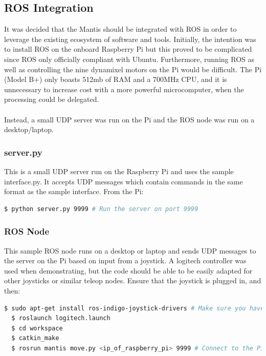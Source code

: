\documentclass[]{article}
\begin{document}
\subsection{ROS Integration}
It was decided that the Mantis should be integrated with ROS in order to leverage the existing ecosystem of software and tools. Initially, the intention was to install ROS on the onboard Raspberry Pi but this proved to be complicated since ROS only officially compliant with Ubuntu. Furthermore, running ROS as well as controlling the nine dynamixel motors on the Pi would be difficult. The Pi (Model B+) only boasts 512mb of RAM and a 700MHz CPU, and it is unnecessary to increase cost with a more powerful microcomputer, when the processing could be delegated.
\\
\\
Instead, a small UDP server was run on the Pi and the ROS node was run on a desktop/laptop.

\subsubsection{server.py}
This is a small UDP server run on the Raspberry Pi and uses the sample interface.py. It accepts UDP messages which contain commands in the same format as the sample interface. From the Pi:
\begin{lstlisting}[language=bash]
  $ python server.py 9999 # Run the server on port 9999
\end{lstlisting}
\subsubsection{ROS Node}
This sample ROS node runs on a desktop or laptop and sends UDP messages to the server on the Pi based on input from a joystick. A logitech controller was used when demonstrating, but the code should be able to be easily adapted for other joysticks or similar teleop nodes. Ensure that the joystick is plugged in, and then:
\begin{lstlisting}[language=bash]
  $ sudo apt-get install ros-indigo-joystick-drivers # Make sure you have the joystick drivers
  $ roslaunch logitech.launch
  $ cd workspace
  $ catkin_make
  $ rosrun mantis move.py <ip_of_raspberry_pi> 9999 # Connect to the Pi on port 9999
\end{lstlisting}
\end{document}
